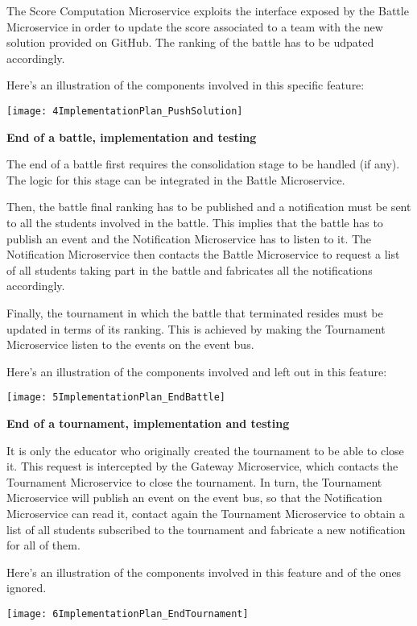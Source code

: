The Score Computation Microservice exploits the interface exposed by the Battle Microservice in order to update the score associated to a team with the new solution provided on GitHub. The ranking of the battle has to be udpated accordingly.

Here's an illustration of the components involved in this specific feature:

\begin{center}
	\texttt{[image: 4ImplementationPlan\_PushSolution]}
\end{center}


\vspace{0.7cm}

\textbf{End of a battle, implementation and testing}

The end of a battle first requires the consolidation stage to be handled (if any). The logic for this stage can be integrated in the Battle Microservice.

Then, the battle final ranking has to be published and a notification must be sent to all the students involved in the battle. This implies that the battle has to publish an event and the Notification Microservice has to listen to it. The Notification Microservice then contacts the Battle Microservice to request a list of all students taking part in the battle and fabricates all the notifications accordingly.


Finally, the tournament in which the battle that terminated resides must be updated in terms of its ranking. This is achieved by making the Tournament Microservice listen to the events on the event bus.

Here's an illustration of the components involved and left out in this feature:

\begin{center}
	\texttt{[image: 5ImplementationPlan\_EndBattle]}
\end{center}


\vspace{0.7cm}

\textbf{End of a tournament, implementation and testing}

It is only the educator who originally created the tournament to be able to close it. This request is intercepted by the Gateway Microservice, which contacts the Tournament Microservice to close the tournament. 
In turn, the Tournament Microservice will publish an event on the event bus, so that the Notification Microservice can read it, contact again the Tournament Microservice to obtain a list of all students subscribed to the tournament and fabricate a new notification for all of them.

Here's an illustration of the components involved in this feature and of the ones ignored.

\begin{center}
	\texttt{[image: 6ImplementationPlan\_EndTournament]}
\end{center}